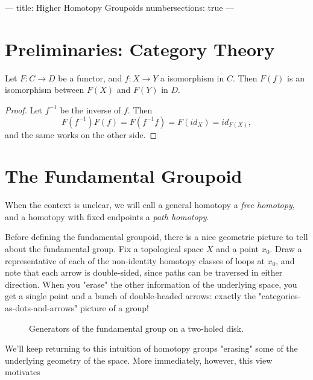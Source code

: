 ---
title: Higher Homotopy Groupoids
numbersections: true
---

\section{Preliminaries: Category Theory}


\begin{thm}\label{functors preserve isomorphism}
	Let $F: C\rightarrow D$ be a functor, and $f: X\rightarrow Y$ a isomorphism in $C$. Then $F(f)$ is an isomorphism between $F(X)$ and $F(Y)$ in $D$.
\end{thm}

\begin{proof}
	Let $f^{-1}$ be the inverse of $f$. Then $$F(f^{-1})F(f) = F(f^{-1}f) = F(id_X) = id_{F(X)},$$ and the same works on the other side.
\end{proof}




\section{The Fundamental Groupoid}
\label{The Fundamental Group}

\begin{notation}
	When the context is unclear, we will call a general homotopy a \emph{free
		homotopy}, and a homotopy with fixed endpoints a \emph{path homotopy}.
\end{notation}

Before defining the fundamental groupoid, there is a nice geometric picture to
tell about the fundamental group. Fix a topological space $X$ and a point
$x_0$. Draw a representative of each of the non-identity homotopy classes of
loops at $x_0$, and note that each arrow is double-sided, since paths can be
traversed in either direction. When you "erase" the other information of the
underlying space, you get a single point and a bunch of double-headed arrows:
exactly the "categories-as-dots-and-arrows" picture of a group!

\begin{figure}[H]
	\centering
	
	\caption{Generators of the fundamental group on a two-holed disk.}
	\label{fig:group}
\end{figure}

We'll keep returning to this intuition of homotopy groups "erasing" some of
the underlying geometry of the space. More immediately, however, this view
motivates %

